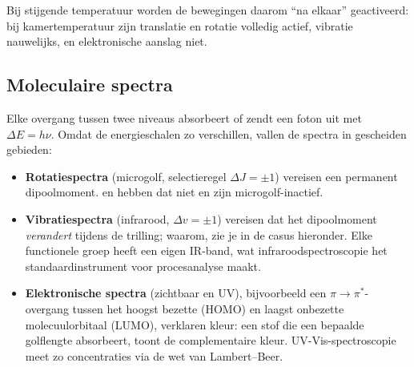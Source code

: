 Bij stijgende temperatuur worden de bewegingen daarom ``na elkaar'' geactiveerd: bij kamertemperatuur zijn translatie en rotatie volledig actief, vibratie nauwelijks, en elektronische aanslag niet.

\subsection{Moleculaire spectra}
\label{sec:moleculaire-spectra}

Elke overgang tussen twee niveaus absorbeert of zendt een foton uit met $\Delta E = h\nu$. Omdat de energieschalen zo verschillen, vallen de spectra in gescheiden gebieden:
\begin{itemize}
\item \textbf{Rotatiespectra} (microgolf, selectieregel $\Delta J=\pm1$) vereisen een permanent dipoolmoment.  en  hebben dat niet en zijn microgolf-inactief.
\item \textbf{Vibratiespectra} (infrarood, $\Delta v=\pm1$) vereisen dat het dipoolmoment \emph{verandert} tijdens de trilling; waarom, zie je in de casus hieronder. Elke functionele groep heeft een eigen IR-band, wat infraroodspectroscopie het standaardinstrument voor procesanalyse maakt.
\item \textbf{Elektronische spectra} (zichtbaar en UV), bijvoorbeeld een $\pi\to\pi^*$-overgang tussen het hoogst bezette (HOMO) en laagst onbezette molecuulorbitaal (LUMO), verklaren kleur: een stof die een bepaalde golflengte absorbeert, toont de complementaire kleur. UV-Vis-spectroscopie meet zo concentraties via de wet van Lambert--Beer.
\end{itemize}

